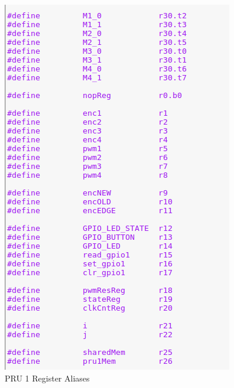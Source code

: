 \documentclass[12pt,oneside,final]{siuethesis}
\theoremstyle{definition}
\begin{document}
\begin{figure}[htbp!]
 \centering
 \includegraphics[scale=.75,keepaspectratio=true]{./images_ch3/pru1_define.png}
 \caption{PRU 1 Register Aliases}
 \label{fig:PRU1_reg}
\end{figure}
\end{document}
